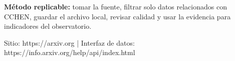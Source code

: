 \documentclass[9pt,a4paper]{extarticle}
\begin{document}
\vspace{0.06cm}
\begin{tcolorbox}[enhanced,colback=white,colframe=cchenpurple!55,boxrule=0.45pt,arc=2pt,left=6pt,right=6pt,top=5pt,bottom=5pt]
{\bfseries\color{cchenpurple}Método replicable:} tomar la fuente, filtrar solo datos relacionados con CCHEN, guardar el archivo local, revisar calidad y usar la evidencia para indicadores del observatorio.
\end{tcolorbox}

\vspace{0.02cm}
{\scriptsize\color{mutedgray}Sitio: https://arxiv.org \quad | \quad Interfaz de datos: https://info.arxiv.org/help/api/index.html}
\end{document}
